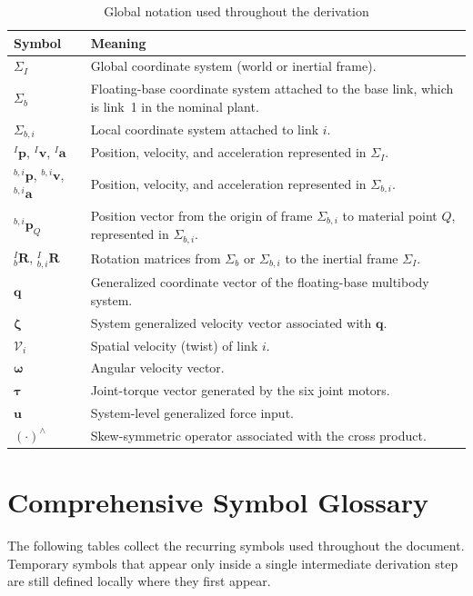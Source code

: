 \documentclass[12pt,a4paper]{report}
\newcommand{\vect}[1]{\mathbf{#1}}
\newcommand{\Frame}[1]{\Sigma_{#1}}
\newcommand{\Rot}[2]{{}_{#1}^{#2}\mathbf{R}}
\newcommand{\angvel}{\boldsymbol{\omega}}
\begin{document}
\begin{table}[H]
\centering
\caption{Global notation used throughout the derivation}
\begin{tabularx}{\textwidth}{@{}lX@{}}
\toprule
Symbol & Meaning \\
\midrule
$\Frame{I}$ & Global coordinate system (world or inertial frame). \\
$\Frame{b}$ & Floating-base coordinate system attached to the base link, which is link~1 in the nominal plant. \\
$\Frame{b,i}$ & Local coordinate system attached to link $i$. \\
${}^{I}\vect{p}$, ${}^{I}\vect{v}$, ${}^{I}\vect{a}$ & Position, velocity, and acceleration represented in $\Frame{I}$. \\
${}^{b,i}\vect{p}$, ${}^{b,i}\vect{v}$, ${}^{b,i}\vect{a}$ & Position, velocity, and acceleration represented in $\Frame{b,i}$. \\
${}^{b,i}\vect{p}_{Q}$ & Position vector from the origin of frame $\Frame{b,i}$ to material point $Q$, represented in $\Frame{b,i}$. \\
$\Rot{b}{I}$, $\Rot{b,i}{I}$ & Rotation matrices from $\Frame{b}$ or $\Frame{b,i}$ to the inertial frame $\Frame{I}$. \\
$\vect{q}$ & Generalized coordinate vector of the floating-base multibody system. \\
$\boldsymbol{\zeta}$ & System generalized velocity vector associated with $\vect{q}$. \\
$\mathcal{V}_i$ & Spatial velocity (twist) of link $i$. \\
$\angvel$ & Angular velocity vector. \\
$\boldsymbol{\tau}$ & Joint-torque vector generated by the six joint motors. \\
$\mathbf{u}$ & System-level generalized force input. \\
$(\cdot)^\wedge$ & Skew-symmetric operator associated with the cross product. \\
\bottomrule
\end{tabularx}
\end{table}

\section*{Comprehensive Symbol Glossary}

The following tables collect the recurring symbols used throughout the document. Temporary symbols that appear only inside a single intermediate derivation step are still defined locally where they first appear.
\end{document}
